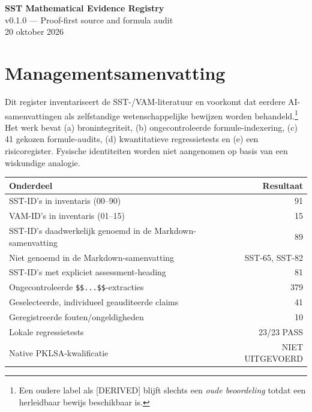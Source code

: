 \documentclass[10pt,a4paper]{article}
\begin{document}
\begin{center}
{\huge\bfseries\color{SSTblue} SST Mathematical Evidence Registry}\\[5pt]
{\Large v0.1.0 --- Proof-first source and formula audit}\\[7pt]
{\large 20 oktober 2026}\\[9pt]
\end{center}
\vspace{6mm}
\section*{Managementsamenvatting}
Dit register inventariseert de SST-/VAM-literatuur en voorkomt dat eerdere AI-samenvattingen als zelfstandige wetenschappelijke bewijzen worden behandeld.\footnote{Een oudere label als [DERIVED] blijft slechts een \emph{oude beoordeling} totdat een herleidbaar bewijs beschikbaar is.} Het werk bevat (a) bronintegriteit, (b) ongecontroleerde formule-indexering, (c) 41 gekozen formule-audits, (d) kwantitatieve regressietests en (e) een risicoregister. Fysische identiteiten worden niet aangenomen op basis van een wiskundige analogie.

\begin{tabular}{p{}r}
\toprule
Onderdeel & Resultaat \\
\midrule
SST-ID's in inventaris (00--90) & 91 \\
VAM-ID's in inventaris (01--15) & 15 \\
SST-ID's daadwerkelijk genoemd in de Markdown-samenvatting & 89 \\
Niet genoemd in de Markdown-samenvatting & SST-65, SST-82 \\
SST-ID's met expliciet assessment-heading & 81 \\
Ongecontroleerde \texttt{\$\$...\$\$}-extracties & 379 \\
Geselecteerde, individueel geauditeerde claims & 41 \\
Geregistreerde fouten/ongeldigheden & 10 \\
Lokale regressietests & 23/23 PASS \\
Native PKLSA-kwalificatie & NIET UITGEVOERD \\
\bottomrule
\end{tabular}
\end{document}
